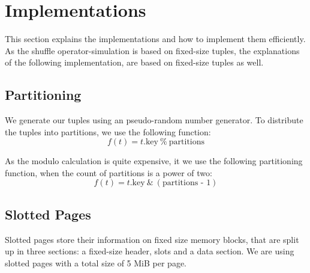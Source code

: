 
\chapter{Implementations}\label{chapter:implementations}
This section explains the implementations and how to implement them efficiently.
As the shuffle operator-simulation is based on fixed-size tuples, the explanations of the following implementation, are based on fixed-size tuples as well.

\section{Partitioning}
We generate our tuples using an pseudo-random number generator.
To distribute the tuples into partitions, we use the following function:
\begin{equation}
  f(t) = t\textrm{.key}\ \%\ \textrm{partitions}
\end{equation}

As the modulo calculation is quite expensive, it we use the following partitioning function, when the count of partitions is a power of two:
\begin{equation}
  f(t) = t\textrm{.key}\ \&\ (\textrm{partitions - 1})
\end{equation}

\section{Slotted Pages}
Slotted pages store their information on fixed size memory blocks, that are split up in three sections: a fixed-size header, slots and a data section.
We are using slotted pages with a total size of 5 MiB per page.

